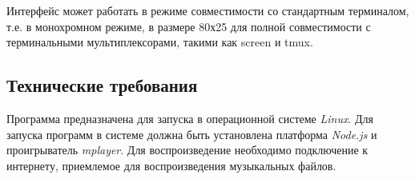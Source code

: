 Интерфейс может работать в режиме совместимости со стандартным
терминалом, т.е. в монохромном режиме, в размере 80х25 для полной
совместимости с терминальными мультиплексорами, такими как screen и tmux.


\subsection{Технические требования}

Программа предназначена для запуска в операционной системе \textit{Linux}. Для
запуска программ в системе должна быть установлена платформа  
\textit{Node.js}  и проигрыватель \textit{mplayer}. Для
воспроизведение необходимо подключение к интернету, приемлемое для
воспроизведения музыкальных файлов. 
